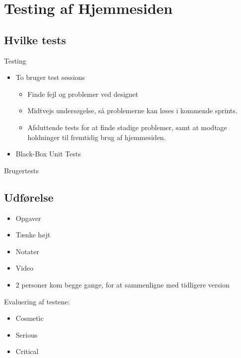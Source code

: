 \section{Testing af Hjemmesiden}

\subsection{Hvilke tests}
\begin{frame}{Testing}
	
	\begin{itemize}
	\item	To bruger test sessions
		\begin{itemize}
			\item Finde fejl og problemer ved designet
			\item Midtvejs undersøgelse, så problemerne kan løses i kommende sprints.
			\item Afsluttende tests for at finde stadige problemer, samt at modtage holdninger til fremtidig brug af hjemmesiden.
		\end{itemize}
	\item 	Black-Box Unit Tests
	
	\end{itemize}
	
\end{frame}

\begin{frame}{Brugertests}
	\subsection{Udførelse}
	
	\begin{itemize}
		\item Opgaver 
		\item Tænke højt
		\item Notater
		\item Video	
		\item 2 personer kom begge gange, for at sammenligne med tidligere version
	\end{itemize}
	
	Evaluering af testene:
	\begin{itemize}
		\item Cosmetic
		\item Serious
		\item Critical
	\end{itemize}
	
\end{frame}


